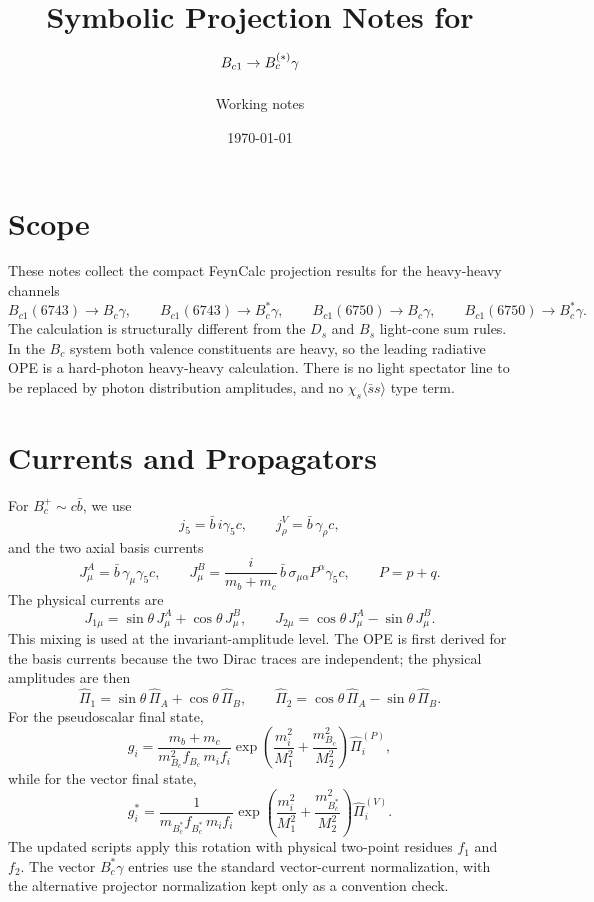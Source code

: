 \documentclass[11pt]{article}
\title{Symbolic Projection Notes for \texorpdfstring{\(\BcOne\to \Bc^{(\ast)}\gamma\)}{Bc1 to Bc gamma}}
\author{Working notes}
\date{\today}
\newcommand{\Bc}{B_c}
\newcommand{\Bcst}{B_c^\ast}
\newcommand{\BcOne}{B_{c1}}
\begin{document}
\maketitle

\section{Scope}

These notes collect the compact FeynCalc projection results for the heavy-heavy
channels
\[
\BcOne(6743)\to \Bc\gamma,\qquad
\BcOne(6743)\to \Bcst\gamma,\qquad
\BcOne(6750)\to \Bc\gamma,\qquad
\BcOne(6750)\to \Bcst\gamma .
\]
The calculation is structurally different from the \(D_s\) and \(B_s\)
light-cone sum rules.  In the \(B_c\) system both valence constituents are
heavy, so the leading radiative OPE is a hard-photon heavy-heavy calculation.
There is no light spectator line to be replaced by photon distribution
amplitudes, and no \(\chi_s\langle\bar s s\rangle\) type term.

\section{Currents and Propagators}

For \(B_c^+\sim c\bar b\), we use
\[
j_5=\bar b\,i\gamma_5 c,\qquad
j_\rho^V=\bar b\,\gamma_\rho c ,
\]
and the two axial basis currents
\[
J_\mu^A=\bar b\,\gamma_\mu\gamma_5 c,\qquad
J_\mu^B=\frac{i}{m_b+m_c}\,
\bar b\,\sigma_{\mu\alpha}P^\alpha\gamma_5 c,
\qquad P=p+q .
\]
The physical currents are
\[
J_{1\mu}=\sin\theta\,J_\mu^A+\cos\theta\,J_\mu^B,\qquad
J_{2\mu}=\cos\theta\,J_\mu^A-\sin\theta\,J_\mu^B .
\]
This mixing is used at the invariant-amplitude level.  The OPE is first
derived for the basis currents because the two Dirac traces are independent;
the physical amplitudes are then
\[
\widehat\Pi_1=\sin\theta\,\widehat\Pi_A+\cos\theta\,\widehat\Pi_B,\qquad
\widehat\Pi_2=\cos\theta\,\widehat\Pi_A-\sin\theta\,\widehat\Pi_B .
\]
For the pseudoscalar final state,
\[
g_i=
\frac{m_b+m_c}{m_{\Bc}^2 f_{\Bc}\,m_i f_i}
\exp\!\left(\frac{m_i^2}{M_1^2}+\frac{m_{\Bc}^2}{M_2^2}\right)
\widehat\Pi_i^{(P)},
\]
while for the vector final state,
\[
g_i^\ast=
\frac{1}{m_{\Bcst}f_{\Bcst}\,m_i f_i}
\exp\!\left(\frac{m_i^2}{M_1^2}+\frac{m_{\Bcst}^2}{M_2^2}\right)
\widehat\Pi_i^{(V)}.
\]
The updated scripts apply this rotation with physical two-point residues
\(f_1\) and \(f_2\).  The vector \(B_c^\ast\gamma\) entries use the standard
vector-current normalization, with the alternative projector normalization kept
only as a convention check.
\end{document}
